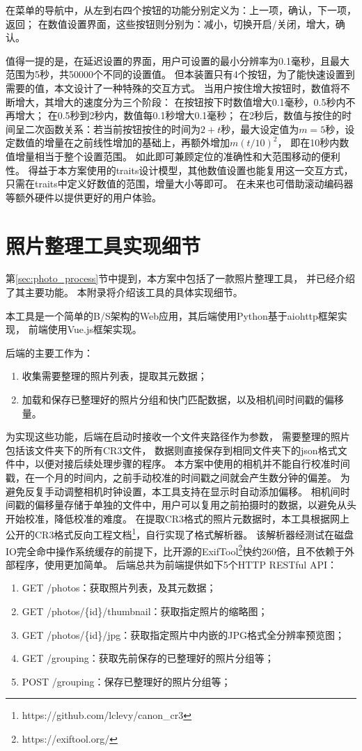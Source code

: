 在菜单的导航中，从左到右四个按钮的功能分别定义为：上一项，确认，下一项，返回；
在数值设置界面，这些按钮则分别为：减小，切换开启/关闭，增大，确认。

值得一提的是，在延迟设置的界面，用户可设置的最小分辨率为0.1毫秒，且最大范围为5秒，共50000个不同的设置值。
但本装置只有4个按钮，为了能快速设置到需要的值，本文设计了一种特殊的交互方式。
当用户按住增大按钮时，数值将不断增大，其增大的速度分为三个阶段：
在按钮按下时数值增大0.1毫秒，0.5秒内不再增大；
在0.5秒到2秒内，数值每0.1秒增大0.1毫秒；
在2秒后，数值与按住的时间呈二次函数关系：若当前按钮按住的时间为$2+t$秒，最大设定值为$m=5$秒，设定数值的增量在之前线性增加的基础上，再额外增加$m(t/10)^2$，
即在10秒内数值增量相当于整个设置范围。
如此即可兼顾定位的准确性和大范围移动的便利性。
得益于本方案使用的traits设计模型，其他数值设置也能复用这一交互方式，只需在traits中定义好数值的范围，增量大小等即可。
在未来也可借助滚动编码器等额外硬件以提供更好的用户体验。

\chapter{照片整理工具实现细节}

第\ref{sec:photo_process}节中提到，本方案中包括了一款照片整理工具，
并已经介绍了其主要功能。
本附录将介绍该工具的具体实现细节。

本工具是一个简单的B/S架构的Web应用，其后端使用Python基于aiohttp框架实现，
前端使用Vue.js框架实现。

后端的主要工作为：
\begin{enumerate}
\item 收集需要整理的照片列表，提取其元数据；
\item 加载和保存已整理好的照片分组和快门匹配数据，以及相机间时间戳的偏移量。
\end{enumerate}
为实现这些功能，后端在启动时接收一个文件夹路径作为参数，
需要整理的照片包括该文件夹下的所有CR3文件，
数据则直接保存到相同文件夹下的json格式文件中，以便对接后续处理步骤的程序。
本方案中使用的相机并不能自行校准时间戳，在一个月的时间内，之前手动校准的时间戳之间就会产生数分钟的偏差。
为避免反复手动调整相机时钟设置，本工具支持在显示时自动添加偏移。
相机间时间戳的偏移量存储于单独的文件中，用户可以复用之前拍摄时的数据，以避免从头开始校准，降低校准的难度。
在提取CR3格式的照片元数据时，本工具根据网上公开的CR3格式反向工程文档\footnote{https://github.com/lclevy/canon\_cr3}，自行实现了格式解析器。
该解析器经测试在磁盘IO完全命中操作系统缓存的前提下，比开源的ExifTool\footnote{https://exiftool.org/}快约260倍，且不依赖于外部程序，使用更加简单。
后端总共为前端提供如下5个HTTP RESTful API：
\begin{enumerate}
\item GET /photos：获取照片列表，及其元数据；
\item GET /photos/\{id\}/thumbnail：获取指定照片的缩略图；
\item GET /photos/\{id\}/jpg：获取指定照片中内嵌的JPG格式全分辨率预览图；
\item GET /grouping：获取先前保存的已整理好的照片分组等；
\item POST /grouping：保存已整理好的照片分组等；
\end{enumerate}

